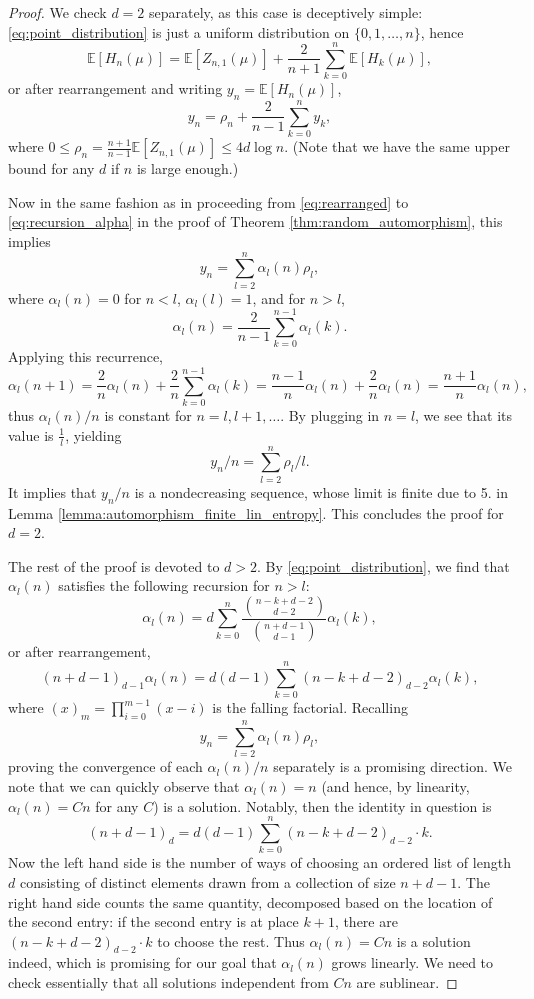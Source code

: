 \documentclass[11pt]{article}
\newcommand{\EE}{\mathbb{E}}
\theoremstyle{definition}
\begin{document}
\begin{proof}
    We check $d=2$ separately, as this case is deceptively simple: \eqref{eq:point_distribution} is just a uniform distribution on $\{0, 1, \dots, n\}$, hence
    \begin{equation}\label{eq:recursion_d=2}
    \EE [H_n(\mu)] = \EE [Z_{n, 1}(\mu)] + \frac{2}{n+1}\sum_{k=0}^{n}\EE [H_k(\mu)],
    \end{equation}
    or after rearrangement and writing $y_n=\EE [H_n(\mu)]$,
    $$y_n = \rho_n + \frac{2}{n-1}\sum_{k=0}^{n}y_k,$$
    where $0\leq \rho_n = \frac{n+1}{n-1}\EE [Z_{n, 1}(\mu)]\leq 4d\log n$. (Note that we have the same upper bound for any $d$ if $n$ is large enough.)
    
    Now in the same fashion as in proceeding from \eqref{eq:rearranged} to \eqref{eq:recursion_alpha} in the proof of Theorem \ref{thm:random_automorphism}, this implies
    $$y_n = \sum_{l=2}^{n}\alpha_l(n)\rho_l,$$
    where $\alpha_l(n)=0$ for $n<l$, $\alpha_l(l)=1$, and for $n>l$,
    $$\alpha_l(n)=\frac{2}{n-1}\sum_{k=0}^{n-1}\alpha_l(k).$$
    Applying this recurrence,
    $$\alpha_l(n+1)= \frac{2}{n}\alpha_l(n)+\frac{2}{n}\sum_{k=0}^{n-1}\alpha_l(k)=\frac{n-1}{n}\alpha_l(n)+\frac{2}{n}\alpha_l(n)=\frac{n+1}{n}\alpha_l(n),$$
    thus $\alpha_l(n)/n$ is constant for $n=l, l+1, \dots$. By plugging in $n=l$, we see that its value is $\frac{1}{l}$, yielding
    $$y_n/n = \sum_{l=2}^{n}\rho_l/l.$$
    It implies that $y_n/n$ is a nondecreasing sequence, whose limit is finite due to 5. in Lemma \ref{lemma:automorphism_finite_lin_entropy}. This concludes the proof for $d=2$.

    The rest of the proof is devoted to $d>2$. By \eqref{eq:point_distribution}, we find that $\alpha_l(n)$ satisfies the following recursion for $n>l$:
    \begin{equation}\label{eq:recursion_alpha_d>2}
    \alpha_l(n)= d\sum_{k=0}^{n}\frac{\binom{n-k+d-2}{d-2}}{\binom{n+d-1}{d-1}}\alpha_l(k),
    \end{equation}
    or after rearrangement,
    \begin{equation}\label{eq:recursion2_alpha_d>2}
    (n+d-1)_{d-1}\alpha_l(n)= d(d-1)\sum_{k=0}^{n}(n-k+d-2)_{d-2}\alpha_l(k),
    \end{equation}    
    where $(x)_m=\prod_{i=0}^{m-1}(x-i)$ is the falling factorial. Recalling
    $$y_n = \sum_{l=2}^{n}\alpha_l(n)\rho_l,$$
    proving the convergence of each $\alpha_l(n)/n$ separately is a promising direction. We note that we can quickly observe that $\alpha_l(n)=n$ (and hence, by linearity, $\alpha_l(n)=Cn$ for any $C$) is a solution. Notably, then the identity in question is
    $$(n+d-1)_{d}= d(d-1)\sum_{k=0}^{n}(n-k+d-2)_{d-2}\cdot k.$$     
    Now the left hand side is the number of ways of choosing an ordered list of length $d$ consisting of distinct elements drawn from a collection of size $n+d-1$. The right hand side counts the same quantity, decomposed based on the location of the second entry: if the second entry is at place $k+1$, there are $(n-k+d-2)_{d-2}\cdot k$ to choose the rest. Thus $\alpha_l(n)=Cn$ is a solution indeed, which is promising for our goal that $\alpha_l(n)$ grows linearly. We need to check essentially that all solutions independent from $Cn$ are sublinear.


\end{proof}
\end{document}
